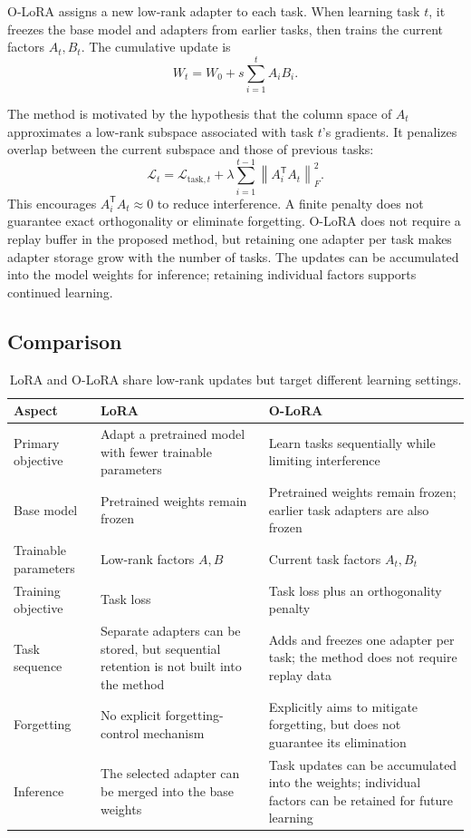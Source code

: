 O-LoRA assigns a new low-rank adapter to each task. When learning task \(t\), it freezes the base model and adapters from earlier tasks, then trains the current factors \(A_t,B_t\). The cumulative update is
\[
  W_t=W_0+s\sum_{i=1}^{t}A_iB_i.
\]

The method is motivated by the hypothesis that the column space of \(A_t\) approximates a low-rank subspace associated with task \(t\)'s gradients. It penalizes overlap between the current subspace and those of previous tasks:
\[
  \mathcal{L}_{t}
  =\mathcal{L}_{\mathrm{task},t}
   +\lambda\sum_{i=1}^{t-1}\left\|A_i^{\mathsf T}A_t\right\|_{F}^{2}.
\]
This encourages \(A_i^{\mathsf T}A_t\approx 0\) to reduce interference. A finite penalty does not guarantee exact orthogonality or eliminate forgetting. O-LoRA does not require a replay buffer in the proposed method, but retaining one adapter per task makes adapter storage grow with the number of tasks. The updates can be accumulated into the model weights for inference; retaining individual factors supports continued learning.

\subsection{Comparison}

\begin{table}[ht]
\centering
\caption{LoRA and O-LoRA share low-rank updates but target different learning settings.}
\label{tab:adapter-method-comparison}
\small
\begin{tabularx}{\textwidth}{@{}>{\raggedright\arraybackslash}p{2.2cm}*{2}{>{\raggedright\arraybackslash}X}@{}}
\toprule
\textbf{Aspect} & \textbf{LoRA} & \textbf{O-LoRA} \\
\midrule
Primary objective
  & Adapt a pretrained model with fewer trainable parameters
  & Learn tasks sequentially while limiting interference \\
Base model
  & Pretrained weights remain frozen
  & Pretrained weights remain frozen; earlier task adapters are also frozen \\
Trainable parameters
  & Low-rank factors \(A,B\)
  & Current task factors \(A_t,B_t\) \\
Training objective
  & Task loss
  & Task loss plus an orthogonality penalty \\
Task sequence
  & Separate adapters can be stored, but sequential retention is not built into the method
  & Adds and freezes one adapter per task; the method does not require replay data \\
Forgetting
  & No explicit forgetting-control mechanism
  & Explicitly aims to mitigate forgetting, but does not guarantee its elimination \\
Inference
  & The selected adapter can be merged into the base weights
  & Task updates can be accumulated into the weights; individual factors can be retained for future learning \\
\bottomrule
\end{tabularx}
\end{table}

